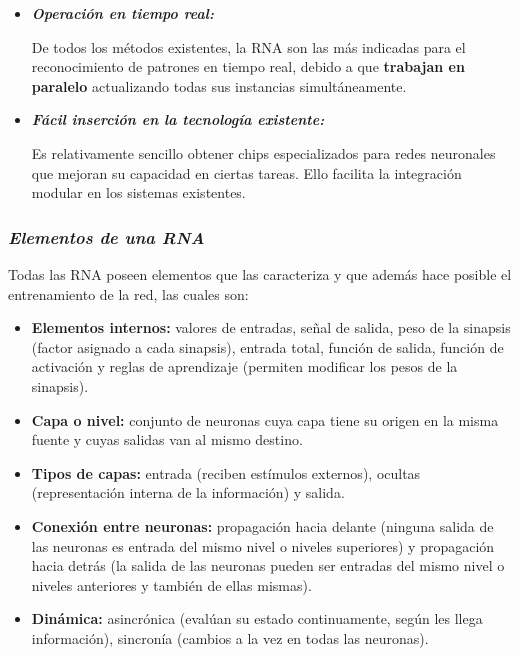 \documentclass[journal]{IEEEtran}
\begin{document}
\begin{itemize}
\item \textbf{\emph{Operación en tiempo real:}}
        
De todos los métodos existentes, la RNA son las más indicadas para el reconocimiento de patrones en tiempo real, debido a que \textbf{trabajan en paralelo} actualizando todas sus instancias simultáneamente.\\
        
\item \textbf{\emph{Fácil inserción en la tecnología existente:}}
        
Es relativamente sencillo obtener chips especializados para redes neuronales que mejoran su capacidad en ciertas tareas. Ello facilita la integración modular en los sistemas existentes.
\end{itemize}
  
\subsubsection{\textbf{\emph{Elementos de una RNA}}}

Todas las RNA poseen elementos que las caracteriza y que además hace posible el entrenamiento de la red, las cuales son:

\begin{itemize}
\item \textbf{Elementos internos:} valores de entradas, señal de salida, peso de la sinapsis (factor asignado a cada sinapsis), entrada total, función de salida, función de activación y reglas de aprendizaje (permiten modificar los pesos de la sinapsis).\\
        
\item \textbf{Capa o nivel:} conjunto de neuronas cuya capa tiene su origen en la misma fuente y cuyas salidas van al mismo destino.\\
        
\item \textbf{Tipos de capas:} entrada (reciben estímulos externos), ocultas (representación interna de la información) y salida.\\
        
\item \textbf{Conexión entre neuronas:} propagación hacia delante (ninguna salida de las neuronas es entrada del mismo nivel o niveles superiores) y propagación hacia detrás (la salida de las neuronas pueden ser entradas del mismo nivel o niveles anteriores y también de ellas mismas).\\
        
\item \textbf{Dinámica:} asincrónica (evalúan su estado continuamente, según les llega información), sincronía (cambios a la vez en todas las neuronas).   
\end{itemize}
  
\end{document}
